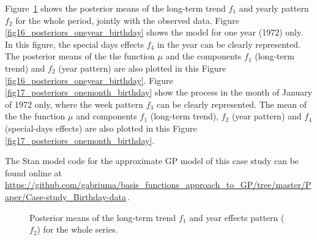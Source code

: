 %

Figure~\ref{fig15_posteriors_birthday} shows the posterior means of the long-term trend $f_1$ and yearly pattern $f_2$ for the whole period, jointly with the observed data. Figure \ref{fig16_posteriors_oneyear_birthday} shows the model for one year (1972) only. In this figure, the special days effects $f_4$ in the year can be clearly represented. The posterior means of the the function $\mu$ and the components $f_1$ (long-term trend) and $f_2$ (year pattern) are also plotted in this Figure \ref{fig16_posteriors_oneyear_birthday}. Figure \ref{fig17_posteriors_onemonth_birthday} show the process in the month of January of 1972 only, where the week pattern $f_3$ can be clearly represented. The mean of the the function $\mu$ and components $f_1$ (long-term trend), $f_2$ (year pattern) and $f_4$ (special-days effects) are also plotted in this Figure \ref{fig17_posteriors_onemonth_birthday}. 

The Stan model code for the approximate GP model of this case study can be found online at {\small \url{https://github.com/gabriuma/basis_functions_approach_to_GP/tree/master/Paper/Case-study_Birthday-data}}\,.

\begin{figure}
\centering
{}
\caption{Posterior means of the long-term trend $f_1$ and year effects pattern ($f_2$) for the whole series. }
  \label{fig15_posteriors_birthday}
\end{figure}


